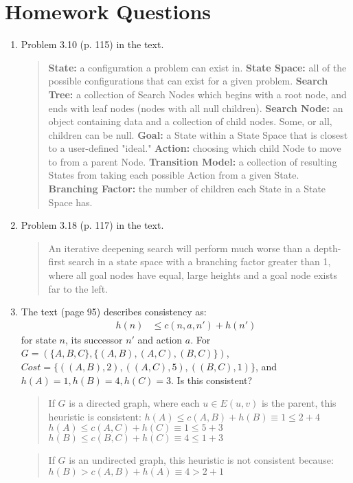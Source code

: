 \documentclass{article}
\begin{document}
\section*{Homework Questions}
\begin{enumerate}
\item Problem 3.10 (p. 115) in the text.
\begin{quote}
\textbf{State:} a configuration a problem can exist in. \newline
\textbf{State Space:} all of the possible configurations that can exist for a given problem. \newline
\textbf{Search Tree:} a collection of Search Nodes which begins with a root node, and ends with leaf nodes (nodes with all null children). \newline
\textbf{Search Node:} an object containing data and a collection of child nodes. Some, or all, children can be null. \newline 
\textbf{Goal:} a State within a State Space that is closest to a user-defined "ideal." \newline
\textbf{Action:} choosing which child Node to move to from a parent Node. \newline
\textbf{Transition Model:} a collection of resulting States from taking each possible Action from a given State. \newline
\textbf{Branching Factor:} the number of children each State in a State Space has.
\end{quote}
\item Problem 3.18 (p. 117) in the text.
\begin{quote}
An iterative deepening search will perform much worse than a depth-first search in a state space with a branching factor greater than 1, where all goal nodes have equal, large heights and a goal node exists far to the left.
\end{quote}
\item The text (page 95) describes consistency as:
\begin{eqnarray*}
h(n) &\leq c(n,a,n') + h(n')
\end{eqnarray*}
for state $n$, its successor $n'$ and action $a$.  For $G = (\{A,B,C\},\{(A,B), (A,C), (B,C)\})$, $Cost = \{((A,B),2), ((A,C),5), ((B,C), 1)\}$, and $h(A) = 1, h(B) = 4, h(C) = 3$. Is this consistent?
\begin{quote}
If $G$ is a directed graph, where each $u \in E(u,v)$ is the parent, this heuristic is consistent:
\newline 
$h(A) \leq c(A, B) + h(B) \equiv 1 \leq 2 + 4$\newline
$h(A) \leq c(A, C) + h(C) \equiv 1 \leq 5 + 3$\newline
$h(B) \leq c(B, C) + h(C) \equiv 4 \leq 1 + 3$
\end{quote}
\begin{quote}
If $G$ is an undirected graph, this heuristic is not consistent because: \newline
$h(B) > c(A, B) + h(A) \equiv 4 > 2 + 1$
\end{quote}


\end{enumerate}
\end{document}
